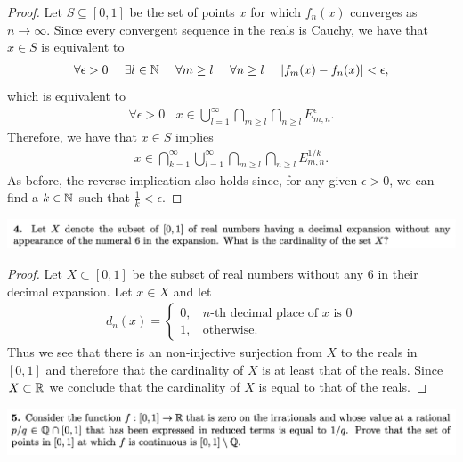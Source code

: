 \begin{proof}
  Let $S \subseteq [0, 1]$ be the set of points $x$ for which $f_n(x)$ converges as $n \to \infty$. Since every
  convergent sequence in the reals is Cauchy, we have that $x \in S$ is equivalent to
  \begin{align*}
    \forall \epsilon > 0 ~~~~ \exists l \in \mathbb{N} ~~~~ \forall m \geq l ~~~~ \forall n \geq l ~~~~ |f_m(x) - f_n(x)| < \epsilon,
  \end{align*}
  which is equivalent to
  \begin{align*}
    \forall \epsilon > 0 ~~~~ x \in \bigcup_{l=1}^\infty \bigcap_{m \geq l} \bigcap_{n \geq l} E_{m,n}^\epsilon.
  \end{align*}
  Therefore, we have that $x \in S$ implies
  \begin{align*}
    x \in \bigcap_{k=1}^\infty \bigcup_{l=1}^\infty \bigcap_{m \geq l} \bigcap_{n \geq l} E_{m,n}^{1/k}.
  \end{align*}
  As before, the reverse implication also holds since, for any given $\epsilon > 0$, we can find a $k \in \mathbb{N}$
  such that $\frac{1}{k} < \epsilon$.
\end{proof}

\newpage
\begin{mdframed}
  \includegraphics[width=400pt]{img/analysis--berkeley-202a--homework-1-f175.png}
\end{mdframed}


\begin{proof}
  Let $X \subset [0, 1]$ be the subset of real numbers without any 6 in their decimal expansion. Let $x \in X$ and let
  \begin{align*}
    d_n(x) =
    \begin{cases}
      0, ~~~~ n\text{-th decimal place of }x \text{ is }0\\
      1, ~~~~ \text{otherwise}.
    \end{cases}
  \end{align*}
  Thus we see that there is an non-injective surjection from $X$ to the reals in $[0, 1]$ and therefore that
  the cardinality of $X$ is at least that of the reals. Since $X \subset \mathbb{R}$ we conclude that the cardinality
  of $X$ is equal to that of the reals.
\end{proof}

\newpage
\begin{mdframed}
  \includegraphics[width=400pt]{img/analysis--berkeley-202a--homework-1-5192.png}
\end{mdframed}




